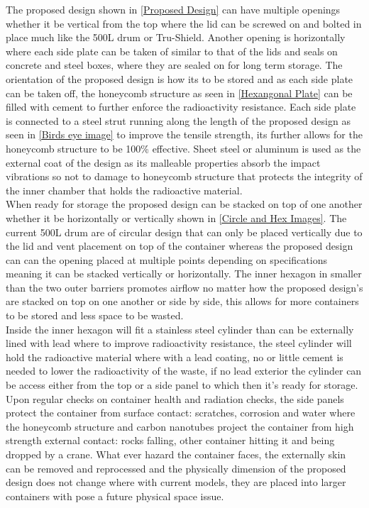 The proposed design shown in \cref{Proposed Design} can have multiple openings whether it be vertical from the top where the lid can be screwed on and bolted in place much like the 500L drum or Tru-Shield. Another opening is horizontally where each side plate can be taken of similar to that of the lids and seals on concrete and steel boxes, where they are sealed on for long term storage. The orientation of the proposed design is how its to be stored and as each side plate can be taken off, the honeycomb structure as seen in \cref{Hexangonal Plate} can be filled with cement to further enforce the radioactivity resistance. Each side plate is connected to a steel strut running along the length of the proposed design as seen in \cref{Birds eye image} to improve the tensile strength, its further allows for the honeycomb structure to be 100\% effective. Sheet steel or aluminum is used as the external coat of the design as its malleable properties absorb the impact vibrations so not to damage to honeycomb structure that protects the integrity of the inner chamber that holds the radioactive material. \\

When ready for storage the proposed design can be stacked on top of one another whether it be horizontally or vertically shown in \cref{Circle and Hex Images}. The current 500L drum are of circular design that can only be placed vertically due to the lid and vent placement on top of the container whereas the proposed design can can the opening placed at multiple points depending on specifications meaning it can be stacked vertically or horizontally. The inner hexagon in smaller than the two outer barriers promotes airflow no matter how the proposed design's are stacked on top on one another or side by side, this allows for more containers to be stored and less space to be wasted. \\

Inside the inner hexagon will fit a stainless steel cylinder than can be externally lined with lead where to improve radioactivity resistance, the steel cylinder will hold the radioactive material where with a lead coating, no or little cement is needed to lower the radioactivity of the waste, if no lead exterior the cylinder can be access either from the top or a side panel to which then it's ready for storage. Upon regular checks on container health and radiation checks, the side panels protect the container from surface contact: scratches, corrosion and water where the honeycomb structure and carbon nanotubes project the container from high strength external contact: rocks falling, other container hitting it and being dropped by a crane. What ever hazard the container faces, the externally skin can be removed and reprocessed and the physically dimension of the proposed design does not change where with current models, they are placed into larger containers with pose a future physical space issue.

